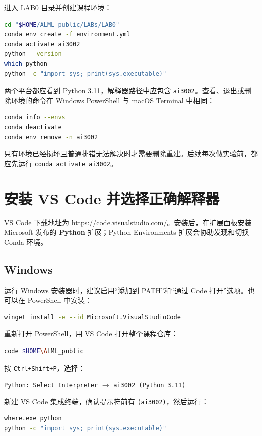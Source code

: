 \documentclass[11pt,a4paper]{article}
\newcommand{\windows}{\subsection*{\textcolor{windowsblue}{Windows}}}
\begin{document}
进入 LAB0 目录并创建课程环境：

\begin{lstlisting}[language=bash]
cd "$HOME/ALML_public/LABs/LAB0"
conda env create -f environment.yml
conda activate ai3002
python --version
which python
python -c "import sys; print(sys.executable)"
\end{lstlisting}

两个平台都应看到 Python 3.11，解释器路径中应包含 \texttt{ai3002}。查看、退出或删除环境的命令在 Windows PowerShell 与 macOS Terminal 中相同：

\begin{lstlisting}[language=bash]
conda info --envs
conda deactivate
conda env remove -n ai3002
\end{lstlisting}

只有环境已经损坏且普通排错无法解决时才需要删除重建。后续每次做实验前，都应先运行 \texttt{conda activate ai3002}。

\section{安装 VS Code 并选择正确解释器}

VS Code 下载地址为 \url{https://code.visualstudio.com/}。安装后，在扩展面板安装 Microsoft 发布的 \textbf{Python} 扩展；Python Environments 扩展会协助发现和切换 Conda 环境。

\windows

运行 Windows 安装器时，建议启用“添加到 PATH”和“通过 Code 打开”选项。也可以在 PowerShell 中安装：

\begin{lstlisting}[language=bash]
winget install -e --id Microsoft.VisualStudioCode
\end{lstlisting}

重新打开 PowerShell，用 VS Code 打开整个课程仓库：

\begin{lstlisting}[language=bash]
code $HOME\ALML_public
\end{lstlisting}

按 \texttt{Ctrl+Shift+P}，选择：

\begin{center}
\texttt{Python: Select Interpreter} $\longrightarrow$ \texttt{ai3002 (Python 3.11)}
\end{center}

新建 VS Code 集成终端，确认提示符前有 \texttt{(ai3002)}，然后运行：

\begin{lstlisting}[language=bash]
where.exe python
python -c "import sys; print(sys.executable)"
\end{lstlisting}
\end{document}
